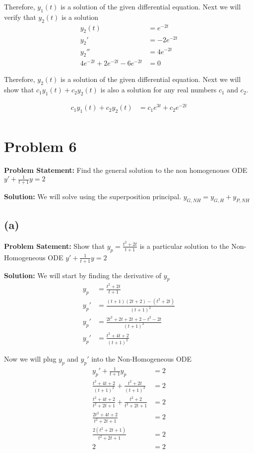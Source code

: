 \documentclass[12pt, letterpaper]{article}
\begin{document}
Therefore, $y_1(t)$ is a solution of the given differential equation. Next we will verify that $y_2(t)$ is a solution
\begin{align*}
    y_2(t) &= e^{-2t} \\
    y_2' &= -2e^{-2t} \\
    y_2'' &= 4e^{-2t} \\
    4e^{-2t} + 2e^{-2t} - 6e^{-2t} &= 0
\end{align*}

Therefore, $y_2(t)$ is a solution of the given differential equation. Next we will show that $c_1y_1(t) + c_2y_2(t)$ is also a solution for any real numbers $c_1$ and $c_2$.

\begin{align*}
    c_1y_1(t) + c_2y_2(t) &= c_1e^{3t} + c_2e^{-2t} \\
\end{align*}

\section*{Problem 6}
\textbf{Problem Statement:} Find the general solution to the non homogenoues ODE $y' + \frac{1}{t+1}y = 2$

\textbf{Solution:} We will solve using the superposition principal. $y_{G,NH} = y_{G,H} + y_{P,NH}$
\subsection*{(a)}
\textbf{Problem Satement:} Show that $y_p = \frac{t^2 + 2t}{t+1}$ is a particular solution to the Non-Homogeneous ODE $y' + \frac{1}{t+1}y = 2$

\textbf{Solution:} We will start by finding the derivative of $y_p$
\begin{align*}
y_p &= \frac{t^2 + 2t}{t+1} \\
y_p' &= \frac{(t+1)(2t+2) - (t^2 + 2t)}{(t+1)^2} \\
y_p' &= \frac{2t^2 + 2t + 2t + 2 - t^2 - 2t}{(t+1)^2} \\
y_p' &= \frac{t^2 + 4t + 2}{(t+1)^2}
\end{align*}

Now we will plug $y_p$ and $y_p'$ into the Non-Homogeneous ODE
\begin{align*}
y_p' + \frac{1}{t+1}y_p &= 2 \\
\frac{t^2 + 4t + 2}{(t+1)^2} + \frac{t^2 + 2t}{(t+1)^2} &= 2 \\
\frac{t^2 + 4t + 2 }{t^2 + 2t + 1} + \frac{t^2+2}{t^2 + 2t + 1} &= 2 \\
\frac{2t^2 + 4t + 2}{t^2 + 2t + 1} &= 2 \\
\frac{2(t^2 + 2t + 1)}{t^2 + 2t + 1} &= 2 \\
2 &= 2
\end{align*}
\end{document}
